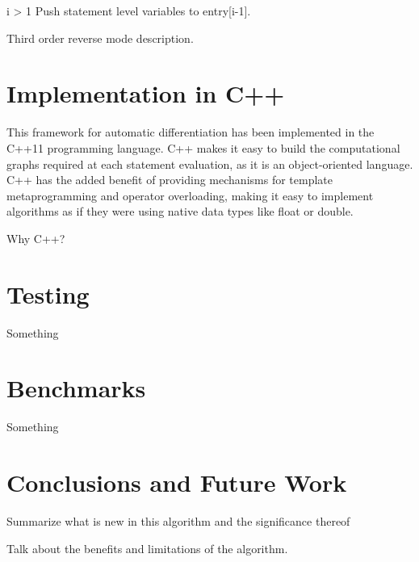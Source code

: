 \documentclass[oneside]{article}
\begin{document}
\begin{algorithm*}[!htb]
\begin{algorithmic}[1]
\begin{varwidth}[t]{\linewidth}
\end{varwidth}
\EndFor
\EndFor
\EndFor
\If i > 1
\State Push statement level variables to entry[i-1].
\EndIf
\EndFor

\end{algorithmic}
 \end{algorithm*}

\begin{editnote}
Third order reverse mode description.
\end{editnote}

\section{Implementation in C++}
This framework for automatic differentiation has been implemented in the C++11 programming language. C++ makes it easy to build the computational graphs required at each statement evaluation, as it is an object-oriented language. C++ has the added benefit of providing mechanisms for template metaprogramming and operator overloading, making it easy to implement algorithms as if they were using native data types like float or double.

\begin{editnote}
Why C++?
\end{editnote}

\section{Testing}

Something

\section{Benchmarks}

Something

\section{Conclusions and Future Work}

Summarize what is new in this algorithm and the significance thereof

\begin{editnote}
Talk about the benefits and limitations of the algorithm.
\end{editnote}
\end{document}
